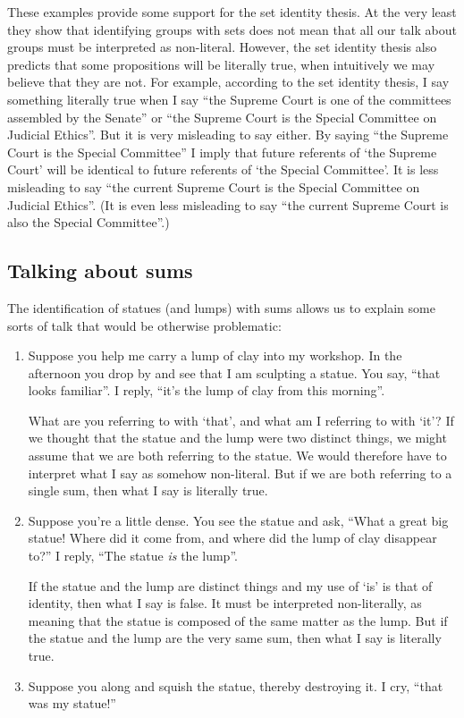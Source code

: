 \documentclass[11pt]{article}
\begin{document}
\begin{spacing}{1.5}
These examples provide some support for the set identity thesis.  At
the very least they show that identifying groups with sets does not
mean that all our talk about groups must be interpreted as
non-literal.  However, the set identity thesis also predicts that some
propositions will be literally true, when intuitively we may believe
that they are not.  For example, according to the set identity thesis,
I say something literally true when I say ``the Supreme Court is one
of the committees assembled by the Senate'' or ``the Supreme Court is
the Special Committee on Judicial Ethics''.  But it is very misleading
to say either.  By saying ``the Supreme Court is the Special
Committee'' I imply that future referents of `the Supreme Court' will
be identical to future referents of `the Special Committee'.  It is
less misleading to say ``the current Supreme Court is the Special
Committee on Judicial Ethics''.  (It is even less misleading to say
``the current Supreme Court is also the Special Committee''.)

\subsection{Talking about sums}
\label{sums-talk}
The identification of statues (and lumps) with sums allows us to
explain some sorts of talk that would be otherwise problematic:

\begin{enumerate}
  \item Suppose you help me carry a lump of clay into my workshop.  In
    the afternoon you drop by and see that I am sculpting a statue.
    You say, ``that looks familiar''.  I reply, ``it's the lump of
    clay from this morning''.

    What are you referring to with `that', and what am I referring to
    with `it'?  If we thought that the statue and the lump were two
    distinct things, we might assume that we are both referring to the
    statue.  We would therefore have to interpret what I say as
    somehow non-literal.  But if we are both referring to a single
    sum, then what I say is literally true.

  \item Suppose you're a little dense.  You see the statue and ask,
    ``What a great big statue!  Where did it come from, and where did
    the lump of clay disappear to?''  I reply, ``The statue {\em is}
    the lump''.

    If the statue and the lump are distinct things and my use of `is'
    is that of identity, then what I say is false.  It must be
    interpreted non-literally, as meaning that the statue is composed
    of the same matter as the lump.  But if the statue and the lump
    are the very same sum, then what I say is literally true.
  \item Suppose you along and squish the statue, thereby destroying
    it.  I cry, ``that was my statue!''


\end{enumerate}
\end{spacing}
\end{document}

